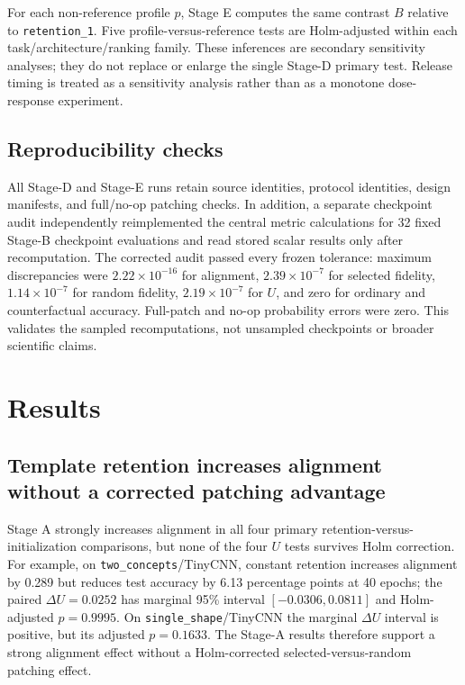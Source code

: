 \documentclass[10pt]{article}
\begin{document}
For each non-reference profile $p$, Stage E computes the same contrast $B$ relative to \texttt{retention\_1}. Five profile-versus-reference tests are Holm-adjusted within each task/architecture/ranking family. These inferences are secondary sensitivity analyses; they do not replace or enlarge the single Stage-D primary test. Release timing is treated as a sensitivity analysis rather than as a monotone dose-response experiment.

\subsection{Reproducibility checks}\label{sec:audit}

All Stage-D and Stage-E runs retain source identities, protocol identities, design manifests, and full/no-op patching checks. In addition, a separate checkpoint audit independently reimplemented the central metric calculations for 32 fixed Stage-B checkpoint evaluations and read stored scalar results only after recomputation. The corrected audit passed every frozen tolerance: maximum discrepancies were $2.22\times10^{-16}$ for alignment, $2.39\times10^{-7}$ for selected fidelity, $1.14\times10^{-7}$ for random fidelity, $2.19\times10^{-7}$ for $U$, and zero for ordinary and counterfactual accuracy. Full-patch and no-op probability errors were zero. This validates the sampled recomputations, not unsampled checkpoints or broader scientific claims.

\section{Results}\label{sec:results}

\subsection{Template retention increases alignment without a corrected patching advantage}\label{sec:stage-a-results}

Stage A strongly increases alignment in all four primary retention-versus-initialization comparisons, but none of the four $U$ tests survives Holm correction. For example, on \texttt{two\_concepts}/TinyCNN, constant retention increases alignment by 0.289 but reduces test accuracy by 6.13 percentage points at 40 epochs; the paired $\Delta U=0.0252$ has marginal 95\% interval $[-0.0306,0.0811]$ and Holm-adjusted $p=0.9995$. On \texttt{single\_shape}/TinyCNN the marginal $\Delta U$ interval is positive, but its adjusted $p=0.1633$. The Stage-A results therefore support a strong alignment effect without a Holm-corrected selected-versus-random patching effect.
\end{document}
